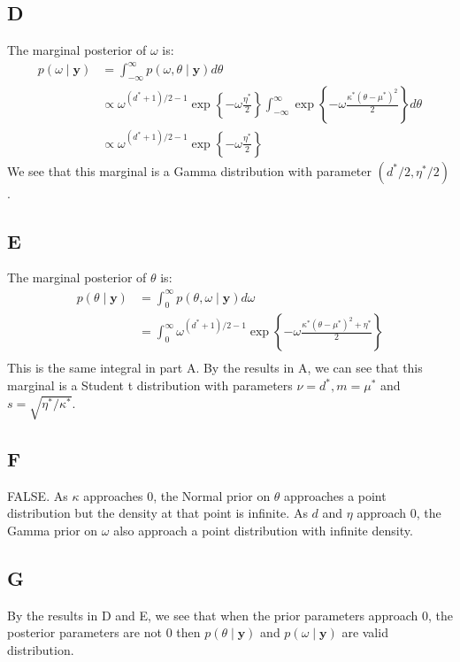 \documentclass{article}
\begin{document}
\subsection*{D}
The marginal posterior of \(\omega\) is:
\begin{align*}
p(\omega \mid \mathbf{y}) &= \int_{-\infty}^{\infty} p(\omega, \theta \mid \mathbf{y}) d\theta\\
&\propto \omega^{(d^*+1)/2 - 1}\exp\left\lbrace -\omega \frac{\eta^*}{2}\right\rbrace \int_{-\infty}^{\infty} \exp\left\lbrace - \omega \frac{\kappa^*(\theta-\mu^*)^2}{2} \right\rbrace d\theta\\
&\propto \omega^{(d^*+1)/2 - 1}\exp\left\lbrace -\omega \frac{\eta^*}{2}\right\rbrace \tag{Gaussian integral}
\end{align*}
We see that this marginal is a Gamma distribution with parameter \((d^*/2, \eta^*/2)\).
\subsection*{E}
The marginal posterior of \(\theta\) is:
\begin{align*}
p(\theta \mid \mathbf{y}) &= \int_0^{\infty} p(\theta, \omega \mid \mathbf{y}) d\omega\\
&= \int_0^{\infty} \omega^{(d^*+1)/2-1} \exp \left\lbrace -\omega\frac{\kappa^*(\theta-\mu^*)^2 + \eta^*}{2}\right\rbrace\\
\end{align*}
This is the same integral in part A. By the results in A, we can see that this marginal is a Student t distribution with parameters \(\nu = d^*, m = \mu^*\) and \(s = \sqrt{\eta^*/\kappa^*}\).

\subsection*{F}
FALSE. As \(\kappa\) approaches \(0\), the Normal prior on \(\theta\) approaches a point distribution but the density at that point is infinite. As \(d\) and \(\eta\) approach \(0\), the Gamma prior on \(\omega\) also approach a point distribution with infinite density.

\subsection*{G}
By the results in D and E, we see that when the prior parameters approach \(0\), the posterior parameters are not \(0\) then \(p(\theta \mid \mathbf{y})\) and \(p(\omega \mid \mathbf{y})\) are valid distribution.
\end{document}
